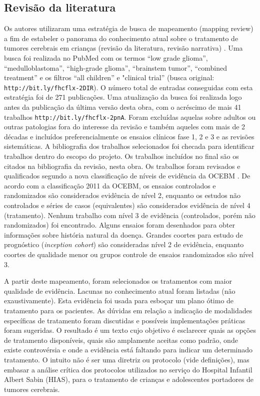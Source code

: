 \documentclass[11pt,a4paper,oldfontcommands]{memoir}
\begin{document}
\subsection{Revisão da literatura}
Os autores utilizaram uma estratégia de busca de mapeamento (mapping review) a fim de estabeler o panorama do conhecimento atual sobre o tratamento de tumores cerebrais em crianças (revisão da literatura, revisão narrativa) \cite{grant,vosgerau}. Uma busca foi realizada no PubMed com os termos “low grade glioma”, “medulloblastoma”, “high-grade glioma”, “brainstem tumor”, “combined treatment” e os filtros “all children” e "clinical trial” (busca original: \texttt{http://bit.ly/fhcflx-2DIR}). O número total de entradas conseguidas com esta estratégia foi de 271 publicações. Uma atualização da busca foi realizada logo antes da publicação da última versão desta obra, com o acréscimo de mais 41 trabalhos \texttt{http://bit.ly/fhcflx-2pnA}. Foram excluídas aquelas sobre adultos ou outras patologias fora do interesse da revisão e também aqueles com mais de 2 décadas e incluídos preferencialmente os ensaios clínicos fase 1, 2 e 3 e as revisões sistemáticas. A bibliografia dos trabalhos selecionados foi checada para identificar trabalhos dentro do escopo do projeto. Os trabalhos incluídos no final são os citados na bibliografia da revisão, nesta obra. Os trabalhos foram revisados e qualificados segundo a nova classificação de níveis de evidência da OCEBM \cite{ocebm}. De acordo com a classificação 2011 da OCEBM, os ensaios controlados e randomizados são considerados evidência de nível 2, enquanto os estudos não controlados e séries de casos (equivalentes) são considerados evidência de nível 4 (tratamento). Nenhum trabalho com nível 3 de evidência (controlados, porém não randomizados) foi encontrado. Alguns ensaios foram desenhados para obter informações sobre história natural da doença. Grandes coortes para estudo de prognóstico (\textit{inception cohort}) são consideradas nível 2 de evidência, enquanto coortes de qualidade menor ou grupos controle de ensaios randomizados são nível 3.

A partir deste mapeamento, foram selecionados os tratamentos com maior qualidade de evidência. Lacunas no conhecimento atual foram listadas (não exaustivamente). Esta evidência foi usada para esboçar um plano ótimo de tratamento para os pacientes. As dúvidas em relação a indicação de modalidades específicas de tratamento foram discutidas e possíveis implementações práticas foram sugeridas. O resultado é um texto cujo objetivo é esclarecer quais as opções de tratamento disponíveis, quais são amplamente aceitas como padrão, onde existe controvérsia e onde a evidência está faltando para indicar um determinado tratamento. O intuito não é ser uma diretriz ou protocolo (vide definições), mas embasar a análise crítica dos protocolos utilizados no serviço do Hospital Infantil Albert Sabin (HIAS), para o tratamento de crianças e adolescentes portadores de tumores cerebrais.
\end{document}
